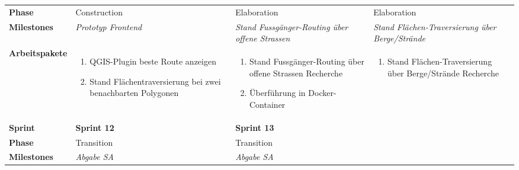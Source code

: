 \begin{landscape}
\begin{longtable}{l p{5.5cm} p{5.5cm} p{5.5cm}}
        \midrule
        \textbf{Phase}
                                & Construction
                                & Elaboration
                                & Elaboration \\
        
        \textbf{Milestones}
                                & \textit{Prototyp Frontend}
                                & \textit{Stand Fussgänger-Routing über offene Strassen}
                                & \textit{Stand Flächen-Traversierung über Berge/Strände}  \\
        
        \textbf{Arbeitspakete}
                                & \begin{enumerate}[noitemsep]
                                    \item QGIS-Plugin beste Route anzeigen
                                    \item Stand Flächentraversierung bei zwei benachbarten Polygonen

                                \end{enumerate}
                                & \begin{enumerate}[noitemsep]
                                    \item Stand Fussgänger-Routing über offene Strassen Recherche
                                    \item Überführung in Docker-Container
                                \end{enumerate}
                                & \begin{enumerate}[noitemsep]
                                    \item Stand Flächen-Traversierung über Berge/Strände Recherche
                                \end{enumerate} \\
                                
        
        \toprule
        \textbf{Sprint}
                                & \textbf{Sprint 12}
                                & \textbf{Sprint 13}
                                & \\
        
        \midrule
        \textbf{Phase}
                                & Transition
                                & Transition
                                & \\
        
        \textbf{Milestones}
                                & \textit{Abgabe SA}
                                & \textit{Abgabe SA}
                                & \\
        

\end{longtable}
\end{landscape}
